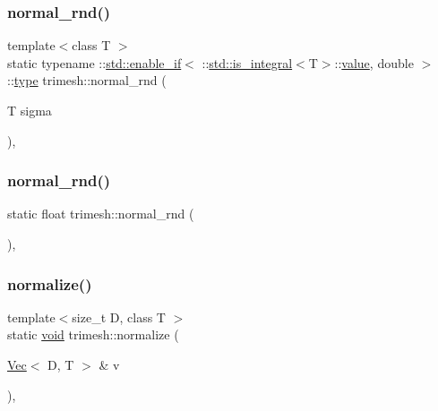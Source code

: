 \subsubsection{\texorpdfstring{normal\+\_\+rnd()}{normal\_rnd()}\hspace{0.1cm}{\footnotesize\ttfamily [2/3]}}
{\footnotesize\ttfamily template$<$class T $>$ \\
static typename \+::\hyperlink{structstd_1_1enable__if}{std\+::enable\+\_\+if}$<$ \+::\hyperlink{structstd_1_1is__integral}{std\+::is\+\_\+integral}$<$T$>$\+::\hyperlink{namespacetrimesh_ab10cc1052c9d1d1376d92211b6ca27dd}{value}, double $>$\+::\hyperlink{namespacetrimesh_aa726c5bf9cff74a26269e8d258ae9e3d}{type} trimesh\+::normal\+\_\+rnd (\begin{DoxyParamCaption}\item[{T}]{sigma }\end{DoxyParamCaption})\hspace{0.3cm}{\ttfamily [inline]}, {\ttfamily [static]}}

\mbox{\label{namespacetrimesh_a8365b585f63a97afe9c9ec4167170f73}} 
\subsubsection{\texorpdfstring{normal\+\_\+rnd()}{normal\_rnd()}\hspace{0.1cm}{\footnotesize\ttfamily [3/3]}}
{\footnotesize\ttfamily static float trimesh\+::normal\+\_\+rnd (\begin{DoxyParamCaption}{ }\end{DoxyParamCaption})\hspace{0.3cm}{\ttfamily [inline]}, {\ttfamily [static]}}

\mbox{\label{namespacetrimesh_a6112519bf9a90f2372e2d89fe341d367}} 
\subsubsection{\texorpdfstring{normalize()}{normalize()}}
{\footnotesize\ttfamily template$<$size\+\_\+t D, class T $>$ \\
static \hyperlink{namespacetrimesh_a784ddfd979e1c579bda795a8edfc3f43}{void} trimesh\+::normalize (\begin{DoxyParamCaption}\item[{\hyperlink{classtrimesh_1_1Vec}{Vec}$<$ D, T $>$ \&}]{v }\end{DoxyParamCaption})\hspace{0.3cm}{\ttfamily [inline]}, {\ttfamily [static]}}



